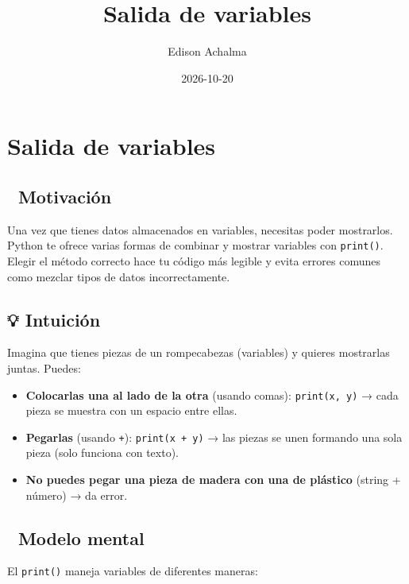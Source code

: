 \documentclass[
  doc,
  floatsintext,
  longtable,
  a4paper,
  nolmodern,
  notxfonts,
  notimes,
  12pt,
  colorlinks=true,linkcolor=blue,citecolor=blue,urlcolor=blue]{apa7}
\title{Salida de variables}
\author{Edison Achalma}
\affiliation{
{Escuela Profesional de Economía, Universidad Nacional de San Cristóbal
de Huamanga}}
\date{2026-10-20}
\providecommand{\tightlist}{%
  \setlength{\itemsep}{0pt}\setlength{\parskip}{0pt}}
\begin{document}
\maketitle


\hypertarget{toc}{}
\tableofcontents
\newpage
\section[Introduction]{Salida de variables}

\setcounter{secnumdepth}{3}

\setlength\LTleft{0pt}




\subsection{🎯 Motivación}\label{motivaciuxf3n}

Una vez que tienes datos almacenados en variables, necesitas poder
mostrarlos. Python te ofrece varias formas de combinar y mostrar
variables con \texttt{print()}. Elegir el método correcto hace tu código
más legible y evita errores comunes como mezclar tipos de datos
incorrectamente.

\subsection{💡 Intuición}\label{intuiciuxf3n}

Imagina que tienes piezas de un rompecabezas (variables) y quieres
mostrarlas juntas. Puedes:

\begin{itemize}
\tightlist
\item
  \textbf{Colocarlas una al lado de la otra} (usando comas):
  \texttt{print(x,\ y)} → cada pieza se muestra con un espacio entre
  ellas.
\item
  \textbf{Pegarlas} (usando \texttt{+}): \texttt{print(x\ +\ y)} → las
  piezas se unen formando una sola pieza (solo funciona con texto).
\item
  \textbf{No puedes pegar una pieza de madera con una de plástico}
  (string + número) → da error.
\end{itemize}

\subsection{🧠 Modelo mental}\label{modelo-mental}

El \texttt{print()} maneja variables de diferentes maneras:
\end{document}
